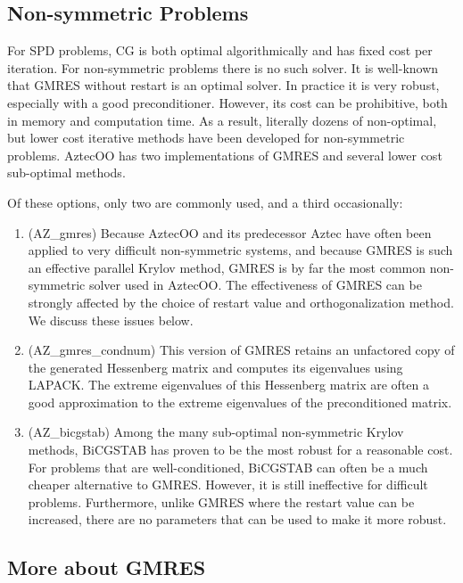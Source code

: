 \documentclass[12pt,relax]{AztecOOUserGuide}
\begin{document}
\subsection{Non-symmetric Problems}

For SPD problems, CG is both optimal algorithmically and has fixed
cost per iteration.  For non-symmetric problems there is no such
solver.  It is well-known that GMRES without restart is an optimal
solver.  In practice it is very robust, especially with a good
preconditioner.  However, its cost can be prohibitive, both in
memory and computation time.  As a result, literally dozens of
non-optimal, but lower cost iterative methods have been developed
for non-symmetric problems.  AztecOO has two implementations of
GMRES and several lower cost sub-optimal methods.

Of these options, only two are commonly used, and a third
occasionally:
\begin{enumerate}
  \item (AZ\_gmres) Because AztecOO and its predecessor Aztec have
  often been applied to very difficult non-symmetric systems, and
  because GMRES is such an effective parallel Krylov method, GMRES is by far
  the most common non-symmetric solver used in AztecOO.  The
  effectiveness of GMRES can be strongly affected by the choice of
  restart value and orthogonalization method.  We discuss these
  issues below.
  \item (AZ\_gmres\_condnum) This version of GMRES retains an
  unfactored copy of the generated Hessenberg matrix and computes
  its eigenvalues using LAPACK.  The extreme eigenvalues of this
  Hessenberg
  matrix are often a good approximation to the extreme eigenvalues
  of the preconditioned matrix.
  \item (AZ\_bicgstab) Among the many sub-optimal non-symmetric
  Krylov methods, BiCGSTAB has proven to be the most robust for a
  reasonable cost.  For problems that are well-conditioned, BiCGSTAB
  can often be a much cheaper alternative to GMRES.  However, it is
  still ineffective for difficult problems.  Furthermore, unlike
  GMRES where the restart value can be increased, there are
  no parameters that can be used to make it more robust.
\end{enumerate}

\subsection{More about GMRES}
\end{document}
